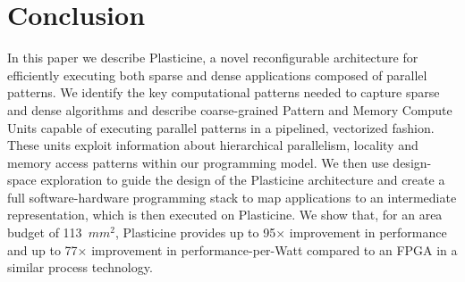 \section{Conclusion}
\label{conclusion}
In this paper we describe Plasticine, a novel reconfigurable architecture for efficiently executing both sparse
and dense applications composed of parallel patterns. We identify the key computational patterns
needed to capture sparse and dense algorithms and describe coarse-grained Pattern and Memory Compute Units capable of executing parallel patterns
in a pipelined, vectorized fashion. These units exploit information about hierarchical parallelism, locality and
memory access patterns within our programming model.
We then use design-space exploration to guide the design of the Plasticine
architecture and create a full software-hardware programming stack to map applications to an
intermediate representation, which is then executed on Plasticine.
We show that, for an area budget of 113~$mm^2$, Plasticine provides up to 95$\times$ improvement in performance and 
up to 77$\times$ improvement in performance-per-Watt compared to an FPGA in a similar process technology.
